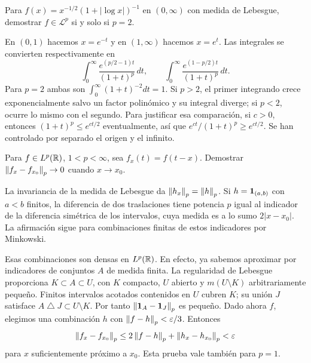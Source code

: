 \begin{ejercicio}\label{ej:v2-l18-9}
Para $f(x)=x^{-1/2}(1+|\log x|)^{-1}$ en $(0,\infty)$ con medida de Lebesgue, demostrar $f\in\mathcal L^p$ si y solo si $p=2$.
\end{ejercicio}
\begin{solucion}
En $(0,1)$ hacemos $x=e^{-t}$ y en $(1,\infty)$ hacemos $x=e^t$. Las integrales se convierten respectivamente en
\[
 \int_0^\infty\frac{e^{(p/2-1)t}}{(1+t)^p}\,dt,
 \qquad \int_0^\infty\frac{e^{(1-p/2)t}}{(1+t)^p}\,dt.
\]
Para $p=2$ ambas son $\int_0^\infty(1+t)^{-2}dt=1$. Si $p>2$, el primer integrando crece exponencialmente salvo un factor polinómico y su integral diverge; si $p<2$, ocurre lo mismo con el segundo. Para justificar esa comparación, si $c>0$, entonces $(1+t)^p\le e^{ct/2}$ eventualmente, así que $e^{ct}/(1+t)^p\ge e^{ct/2}$. Se han controlado por separado el origen y el infinito.
\end{solucion}

\begin{ejercicio}\label{ej:v2-l19-1}
Para $f\in L^p(\mathbb R)$, $1<p<\infty$, sea $f_x(t)=f(t-x)$. Demostrar $\left\lVert f_x-f_{x_0}\right\rVert_p\to0$ cuando $x\to x_0$.
\end{ejercicio}
\begin{solucion}
La invariancia de la medida de Lebesgue da $\left\lVert h_x\right\rVert_p=\left\lVert h\right\rVert_p$. Si $h=\mathbf1_{(a,b)}$ con $a<b$ finitos, la diferencia de dos traslaciones tiene potencia $p$ igual al indicador de la diferencia simétrica de los intervalos, cuya medida es a lo sumo $2|x-x_0|$. La afirmación sigue para combinaciones finitas de estos indicadores por Minkowski.

Esas combinaciones son densas en $L^p(\mathbb R)$. En efecto, ya sabemos aproximar por indicadores de conjuntos $A$ de medida finita. La regularidad de Lebesgue proporciona $K\subset A\subset U$, con $K$ compacto, $U$ abierto y $m(U\setminus K)$ arbitrariamente pequeño. Finitos intervalos acotados contenidos en $U$ cubren $K$; su unión $J$ satisface $A\mathbin\triangle J\subset U\setminus K$. Por tanto $\left\lVert\mathbf1_{A}-\mathbf1_{J}\right\rVert_p$ es pequeño. Dado ahora $f$, elegimos una combinación $h$ con $\left\lVert f-h\right\rVert_p<\varepsilon/3$. Entonces
\[
 \left\lVert f_x-f_{x_0}\right\rVert_p\le2\left\lVert f-h\right\rVert_p+\left\lVert h_x-h_{x_0}\right\rVert_p<\varepsilon
\]
para $x$ suficientemente próximo a $x_0$. Esta prueba vale también para $p=1$.
\end{solucion}


